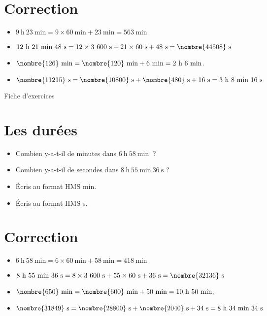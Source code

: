 \documentclass[a4paper,11pt,fleqn]{article}
\begin{document}
\section{Correction}
\begin{itemize}
 \item $9~\text{h}~23~\text{min}=9\times60~\text{min}+23~\text{min}=563~\text{min}$
  \item $12~\text{h}~21~\text{min}~48~\text{s}=12\times3~600~\text{s}+21\times60~\text{s}+48~\text{s}=\nombre{44508}~\text{s}$
  \item $\nombre{126}~\text{min}=\nombre{120}~\text{min}+6~\text{min}=2~\text{h}~6~\text{min}$.
  \item $\nombre{11215}~\text{s}=\nombre{10800}~\text{s}+\nombre{480}~\text{s}+16~\text{s}=3~\text{h}~8~\text{min}~16~\text{s}$ \end{itemize}


\newpage
\setcounter{exo}{0}
\setcounter{section}{0}
\begin{center}
	{\huge Fiche d'exercices } 	
\end{center}


\section{Les durées}
\begin{itemize}
  \item Combien y-a-t-il de minutes dans $6~\text{h}~58~\text{min}~$ ?
  \item Combien y-a-t-il de secondes dans $8~\text{h}~55~\text{min}~36~\text{s}$ ?
  \item Écris au format HMS  min.
  \item Écris au format HMS  s.
\end{itemize}

\section{Correction}
\begin{itemize}
 \item $6~\text{h}~58~\text{min}=6\times60~\text{min}+58~\text{min}=418~\text{min}$
  \item $8~\text{h}~55~\text{min}~36~\text{s}=8\times3~600~\text{s}+55\times60~\text{s}+36~\text{s}=\nombre{32136}~\text{s}$
  \item $\nombre{650}~\text{min}=\nombre{600}~\text{min}+50~\text{min}=10~\text{h}~50~\text{min}$.
  \item $\nombre{31849}~\text{s}=\nombre{28800}~\text{s}+\nombre{2040}~\text{s}+34~\text{s}=8~\text{h}~34~\text{min}~34~\text{s}$ \end{itemize}
\end{document}
